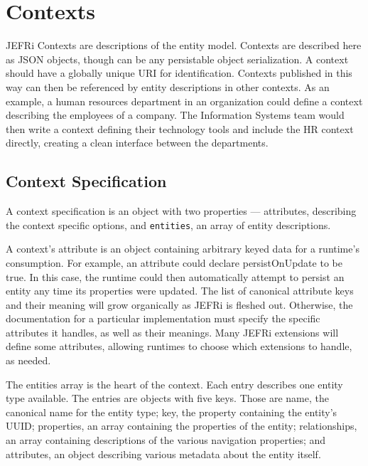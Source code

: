 \documentclass{article}
\begin{document}
\section{Contexts}

JEFRi Contexts are descriptions of the entity model. Contexts are described here
as JSON objects, though can be any persistable object serialization.  A context
should have a globally unique URI for identification. Contexts published in this
way can then be referenced by entity descriptions in other contexts. As an
example, a human resources department in an organization could define a context
describing the employees of a company. The Information Systems team would then
write a context defining their technology tools and include the HR context
directly, creating a clean interface between the departments.

\subsection{Context Specification}

A context specification is an object with two properties --- {\ilcode
attributes}, describing the context specific options, and {\tt entities}, an
array of entity descriptions.

A context's {\ilcode attribute} is an object containing arbitrary keyed data for
a runtime's consumption. For example, an {\ilcode attribute} could declare
{\ilcode persistOnUpdate} to be true. In this case, the runtime could then
automatically attempt to persist an entity any time its properties were updated.
The list of canonical {\ilcode attribute} keys and their meaning will grow
organically as JEFRi is fleshed out. Otherwise, the documentation for a
particular implementation must specify the specific attributes it handles, as
well as their meanings. Many JEFRi extensions will define some attributes,
allowing runtimes to choose which extensions to handle, as needed.

The {\ilcode entities} array is the heart of the context. Each entry describes
one entity type available. The entries are objects with five keys. Those are
{\ilcode name}, the canonical name for the entity type; {\ilcode key}, the
property containing the entity's UUID; {\ilcode properties}, an array containing
the properties of the entity; {\ilcode relationships}, an array containing
descriptions of the various navigation properties; and {\ilcode attributes}, an
object describing various metadata about the entity itself.
\end{document}
